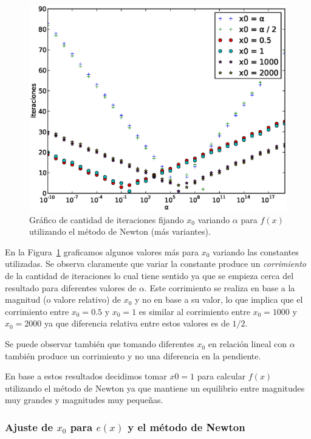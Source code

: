 \begin{figure}[!htbp]
  \begin{center}
    \includegraphics[scale=0.5]{graficos/new/f_newton_x0_fijo_2.eps}
    \caption{\label{fig:f_newton_x0_fijo_2} Gráfico de cantidad de iteraciones fijando $x_0$ variando $\alpha$ para $f(x)$ utilizando el método de Newton (más variantes).}
  \end{center}
\end{figure}

En la Figura~\ref{fig:f_newton_x0_fijo_2} graficamos algunos valores más para
$x_0$ variando las constantes utilizadas. Se observa claramente que variar la
constante produce un \emph{corrimiento} de la cantidad de iteraciones lo cual
tiene sentido ya que se empieza cerca del resultado para diferentes valores de
$\alpha$. Este corrimiento se realiza en base a la magnitud (o valore relativo)
de $x_0$ y no en base a su valor, lo que implica que el corrimiento entre $x_0
= 0.5$ y $x_0 = 1$ es similar al corrimiento entre $x_0 = 1000$ y $x_0 = 2000$
ya que diferencia relativa entre estos valores es de $1/2$.

Se puede observar también que tomando diferentes $x_0$ en relación lineal con
$\alpha$ también produce un corrimiento y no una diferencia en la pendiente.

En base a estos resultados decidimos tomar $x0 = 1$ para calcular $f(x)$
utilizando el método de Newton ya que mantiene un equilibrio entre magnitudes
muy grandes y magnitudes muy pequeñas.

\subsubsection{Ajuste de $x_0$ para $e(x)$ y el método de Newton}

